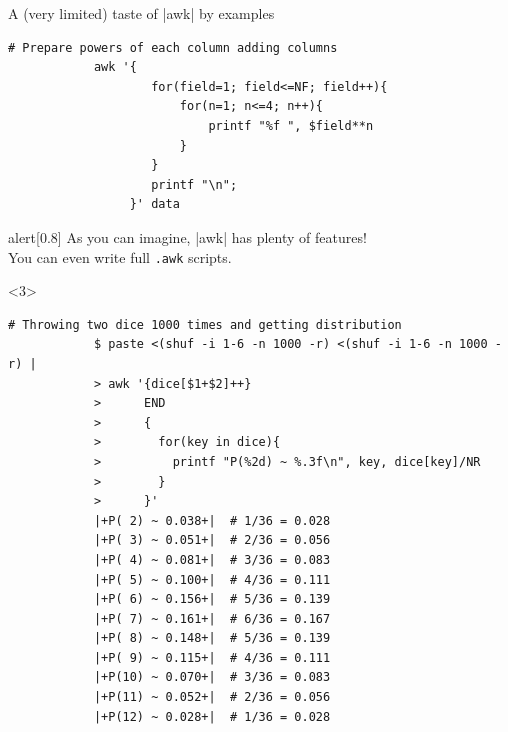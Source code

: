 \begin{frame}[fragile]{A (very limited) taste of \bash|awk| by examples}
\begin{onlyenv}
\begin{lstlisting}[style=MyBash, numbers=none, xleftmargin=3mm, xrightmargin=3mm, belowskip=-3mm]
            # Prepare powers of each column adding columns
            awk '{
                    for(field=1; field<=NF; field++){
                        for(n=1; n<=4; n++){
                            printf "%f ", $field**n
                        }
                    }
                    printf "\n";
                 }' data
        \end{lstlisting}
        \begin{varblock}{alert}[0.8\textwidth]{}
            \Large \alert{As you can imagine, \bash|awk| has plenty of features!}\\
            You can even write full \texttt{.awk} scripts.
        \end{varblock}
    \end{onlyenv}
    \begin{onlyenv}<3>
        \begin{lstlisting}[style=MyBash, numbers=none, xleftmargin=3mm, xrightmargin=3mm]
            # Throwing two dice 1000 times and getting distribution
            $ paste <(shuf -i 1-6 -n 1000 -r) <(shuf -i 1-6 -n 1000 -r) |
            > awk '{dice[$1+$2]++}
            >      END
            >      {
            >        for(key in dice){
            >          printf "P(%2d) ~ %.3f\n", key, dice[key]/NR
            >        }
            >      }'
            |+P( 2) ~ 0.038+|  # 1/36 = 0.028
            |+P( 3) ~ 0.051+|  # 2/36 = 0.056
            |+P( 4) ~ 0.081+|  # 3/36 = 0.083
            |+P( 5) ~ 0.100+|  # 4/36 = 0.111
            |+P( 6) ~ 0.156+|  # 5/36 = 0.139
            |+P( 7) ~ 0.161+|  # 6/36 = 0.167
            |+P( 8) ~ 0.148+|  # 5/36 = 0.139
            |+P( 9) ~ 0.115+|  # 4/36 = 0.111
            |+P(10) ~ 0.070+|  # 3/36 = 0.083
            |+P(11) ~ 0.052+|  # 2/36 = 0.056
            |+P(12) ~ 0.028+|  # 1/36 = 0.028
        \end{lstlisting}
    \end{onlyenv}
\end{frame}
